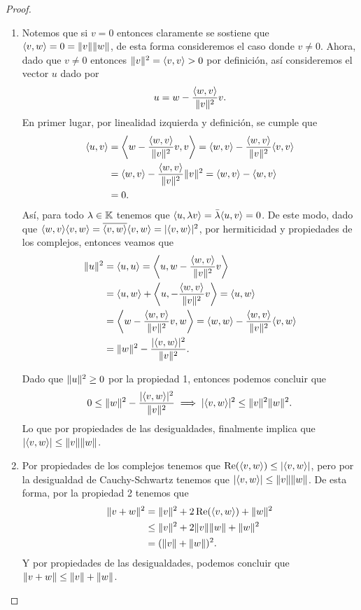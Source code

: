 \begin{proof}
\begin{enumerate}
    \item Notemos que si $v = 0$ entonces claramente se sostiene que $\langle v,w\rangle = 0 = \mathopen\|v\mathclose\| \mathopen\|w\mathclose\|$, de esta forma consideremos el caso donde $v \neq 0$. Ahora, dado que $v \neq 0$ entonces $\mathopen\|v\mathclose\|^2 = \langle v,v\rangle > 0$ por definición, así consideremos el vector $u$ dado por
      \[
        u = w - \frac{\langle w,v\rangle}{\mathopen\|v\mathclose\|^2} v.
      \]
    En primer lugar, por linealidad izquierda y definición, se cumple que 
      \begin{align*}
        \inner{u, v} &=  \Inner{w - \frac{\inner{w,v}}{\norm{v}^2} v, v} 
           = \inner{w,v} - \frac{\inner{w,v}}{\norm{v}^2}  \inner{v,v} \\
          &= \inner{w,v} - \frac{\inner{w,v}}{\norm{v}^2}  \norm{v}^2 
           = \inner{w,v} - \inner{w,v} \\
          &= 0.
      \end{align*}
    Así, para todo $\lambda \in \mathbb{K}$ tenemos que $\langle u,\lambda v\rangle = \bar \lambda \langle u,v\rangle = 0$. De este modo, dado que $\langle w,v\rangle \langle v,w\rangle =\overline{\langle v,w\rangle}  \langle v,w\rangle = \mathopen|\langle v,w\rangle\mathclose|^2$, por hermiticidad y propiedades de los complejos, entonces veamos que 
      \begin{align*}
        \norm{u}^2 &= \inner{u, u}
           = \Inner{u, w - \frac{\inner{w,v}}{\norm{v}^2} v} \\
          &= \inner{u,w} + \Inner{u, - \frac{\inner{w,v}}{\norm{v}^2} v} 
           = \inner{u,w} \\
          &= \Inner{w - \frac{\inner{w,v}}{\norm{v}^2} v, w} 
           = \inner{w,w} - \frac{\inner{w,v}}{\norm{v}^2} \inner{v,w} \\
          &= \norm{w}^2 - \frac{\abs{\inner{v,w}}^2}{\norm{v}^2}.
      \end{align*}
    
    Dado que $\mathopen\|u\mathclose\|^2 \geq 0$ por la propiedad 1, entonces podemos concluir que
      \[0 \leq \mathopen\|w\mathclose\|^2 - \frac{\mathopen|\langle v,w\rangle\mathclose|^2}{\mathopen\|v\mathclose\|^2}
          \implies
        \mathopen|\langle v,w\rangle\mathclose|^2 \leq \mathopen\|v\mathclose\|^2 \mathopen\|w\mathclose\|^2.
      \]
    Lo que por propiedades de las desigualdades, finalmente implica que $\mathopen|\langle v,w\rangle\mathclose| \leq \mathopen\|v\mathclose\| \mathopen\|w\mathclose\|$.

    \item Por propiedades de los complejos tenemos que $\operatorname{Re}(\langle v,w\rangle) \leq \mathopen|\langle v,w\rangle\mathclose|$, pero por la desigualdad de Cauchy-Schwartz tenemos que $\mathopen|\langle v,w\rangle\mathclose| \leq \mathopen\|v\mathclose\| \mathopen\|w\mathclose\|$. De esta forma, por la propiedad 2 tenemos que 
      \begin{align*}
        \mathopen\|v+w\mathclose\|^2 &= \mathopen\|v\mathclose\|^2 + 2 \operatorname{Re}(\langle v,w\rangle) + \mathopen\|w\mathclose\|^2 \\
          &\leq \mathopen\|v\mathclose\|^2 + 2\mathopen\|v\mathclose\| \mathopen\|w\mathclose\| + \mathopen\|w\mathclose\|^2 \\
          &= (\mathopen\|v\mathclose\| + \mathopen\|w\mathclose\|)^2.
      \end{align*}
    Y por propiedades de las desigualdades, podemos concluir que $\mathopen\|v+w\mathclose\| \leq \mathopen\|v\mathclose\|+\mathopen\|w\mathclose\|$. \qedhere
  \end{enumerate}
\end{proof}

